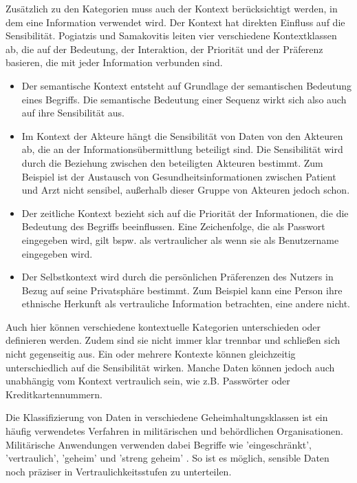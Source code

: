 Zusätzlich zu den Kategorien muss auch der Kontext berücksichtigt werden, in dem eine Information verwendet wird. Der Kontext hat direkten Einfluss auf die Sensibilität. Pogiatzis und Samakovitis \cite{Pogiatzis.2020} leiten vier verschiedene Kontextklassen ab, die auf der Bedeutung, der Interaktion, der Priorität und der Präferenz basieren, die mit jeder Information verbunden sind.

\begin{itemize}
    \item Der semantische Kontext entsteht auf Grundlage der semantischen Bedeutung eines Begriffs. Die semantische Bedeutung einer Sequenz wirkt sich also auch auf ihre Sensibilität aus.
    \item Im Kontext der Akteure hängt die Sensibilität von Daten von den Akteuren ab, die an der Informationsübermittlung beteiligt sind. Die Sensibilität wird durch die Beziehung zwischen den beteiligten Akteuren bestimmt. Zum Beispiel ist der Austausch von Gesundheitsinformationen zwischen Patient und Arzt nicht sensibel, außerhalb dieser Gruppe von Akteuren jedoch schon.
    \item Der zeitliche Kontext bezieht sich auf die Priorität der Informationen, die die Bedeutung des Begriffs beeinflussen. Eine Zeichenfolge, die als Passwort eingegeben wird, gilt bspw. als vertraulicher als wenn sie als Benutzername eingegeben wird.
    \item Der Selbstkontext wird durch die persönlichen Präferenzen des Nutzers in Bezug auf seine Privatsphäre bestimmt. Zum Beispiel kann eine Person ihre ethnische Herkunft als vertrauliche Information betrachten, eine andere nicht.
\end{itemize}
Auch hier können verschiedene kontextuelle Kategorien unterschieden oder definieren werden. Zudem sind sie nicht immer klar trennbar und schließen sich nicht gegenseitig aus. Ein oder mehrere Kontexte können gleichzeitig unterschiedlich auf die Sensibilität wirken. Manche Daten können jedoch auch unabhängig vom Kontext vertraulich sein, wie z.B. Passwörter oder Kreditkartennummern.

Die Klassifizierung von Daten in verschiedene Geheimhaltungsklassen ist ein häufig verwendetes Verfahren in militärischen und behördlichen Organisationen. Militärische Anwendungen verwenden dabei Begriffe wie 'eingeschränkt', 'vertraulich', 'geheim' und 'streng geheim' \cite{Landwehr.1984}. So ist es möglich, sensible Daten noch präziser in Vertraulichkeitsstufen zu unterteilen.

